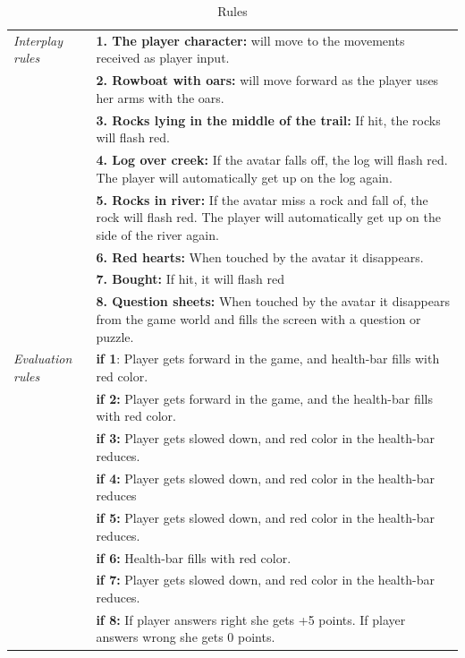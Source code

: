 \begin{table} [H]
\centering
\begin{tabular}{|p{}|p{}|}
\hline
\emph{Interplay rules} & \textbf{1. The player character:} will move to the movements received as player input. \\ \cline{2-2}
& \textbf{2. Rowboat with oars:} will move forward as the player  uses her arms with the oars. \\ \cline{2-2}
& \textbf{3. Rocks lying in the middle of the trail:} If hit, the  rocks will flash red.  \\ \cline{2-2}
& \textbf{4. Log over creek:} If the avatar falls off, the log will flash red. The player will automatically get up on the log again. \\ \cline{2-2}
& \textbf{5. Rocks in river:} If the avatar miss a rock and fall of, the rock will flash red. The player will automatically get up on the side of the river again. \\ \cline{2-2}
&  \textbf{6. Red hearts:} When touched by the avatar it disappears. \\ \cline{2-2}
&  \textbf{7. Bought:} If hit, it will flash red \\ \cline{2-2}
&  \textbf{8. Question sheets:} When touched by the avatar  it  disappears from the game world and fills the screen with  a  question or puzzle. \\ \hline
\emph{Evaluation rules} & \textbf{if 1}: Player gets forward in the game, and health-bar fills with red color. \\ \cline{2-2}
& \textbf{if 2:} Player gets forward in the game, and the health-bar fills with red color.   \\ \cline{2-2}
& \textbf{if 3:} Player gets slowed down, and red color in the health-bar reduces.   \\ \cline{2-2}
& \textbf{if 4:} Player gets slowed down, and red color in the health-bar reduces   \\ \cline{2-2}
& \textbf{if 5:} Player gets slowed down, and red color in the health-bar reduces.   \\ \cline{2-2}
& \textbf{if 6:} Health-bar fills with red color.  \\ \cline{2-2}
& \textbf{if 7:} Player gets slowed down, and red color in the health-bar reduces.  \\ \cline{2-2}
& \textbf{if 8:} If player answers right she gets +5 points. If player answers wrong she gets 0 points.  \\ \hline
\end{tabular}
\caption[Rules in the "Nature Trail" game]{Rules}
\label{tab:rules1}
\end{table}  

